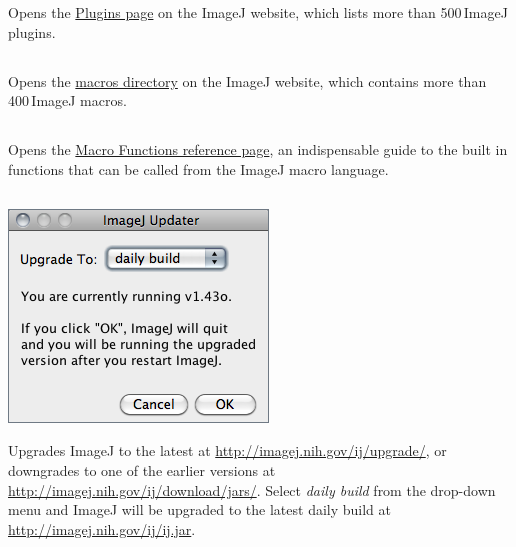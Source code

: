 Opens the \href{http://imagej.nih.gov/ij/plugins/}{Plugins page}
on the ImageJ website, which lists more than 500\,ImageJ plugins. 


\subsection{\protect{}}

Opens the \href{http://imagej.nih.gov/ij/macros/}{macros directory}
on the ImageJ website, which contains more than 400\,ImageJ macros. 


\subsection{\protect{}\label{sub:Macro-Functions...}}

Opens the \href{http://imagej.nih.gov/ij/developer/macro/functions.html}{Macro Functions reference page},
an indispensable guide to the built in functions that can be called
from the ImageJ macro language.




\subsection{\protect{}\label{sub:Update-ImageJ...}}

\begin{minipage}[c][1\totalheight][t]{0.375\columnwidth}%
\includegraphics[scale=0.55]{images/Update}%
\end{minipage}%
\begin{minipage}[c][1\totalheight][t]{0.625\columnwidth}%
Upgrades ImageJ to the latest 
at \url{http://imagej.nih.gov/ij/upgrade/}, or downgrades to one
of the earlier versions at \url{http://imagej.nih.gov/ij/download/jars/}.
Select \emph{daily build} from the drop-down menu and ImageJ will
be upgraded to the latest daily build at \url{http://imagej.nih.gov/ij/ij.jar}.


%
\end{minipage}


